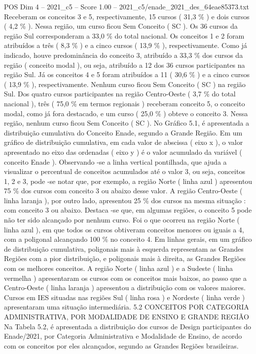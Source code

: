 \begin{textsample}{POS Dim 4 – 2021\_c5 – Score 1.00 – 2021\_c5/enade\_2021\_des\_64eae85373.txt}
Receberam os conceitos 3 e 5, respectivamente, 15 cursos ( 31,3 \% ) e dois cursos ( 4,2 \% ).
Nessa região, um curso ficou Sem Conceito ( SC ).
Os 36 cursos da região Sul corresponderam a 33,0 \% do total nacional.
Os conceitos 1 e 2 foram atribuídos a três ( 8,3 \% ) e a cinco cursos ( 13,9 \% ), respectivamente.
Como já indicado, houve predominância do conceito 3, atribuído a 33,3 \% dos cursos da região ( conceito modal ), ou seja, atribuído a 12 dos 36 cursos participantes na região Sul.
Já os conceitos 4 e 5 foram atribuídos a 11 ( 30,6 \% ) e a cinco cursos ( 13,9 \% ), respectivamente.
Nenhum curso ficou Sem Conceito ( SC ) na região Sul.
Dos quatro cursos participantes na região Centro-Oeste ( 3,7 \% do total nacional ), três ( 75,0 \% em termos regionais ) receberam conceito 5, o conceito modal, como já fora destacado, e um curso ( 25,0 \% ) obteve o conceito 3.
Nessa região, nenhum curso ficou Sem Conceito ( SC ).
No Gráfico 5.1, é apresentada a distribuição cumulativa do Conceito Enade, segundo a Grande Região.
Em um gráfico de distribuição cumulativa, em cada valor de abscissa ( eixo x ), o valor apresentado no eixo das ordenadas ( eixo y ) é o valor acumulado da variável ( conceito Enade ).
Observando -se a linha vertical pontilhada, que ajuda a visualizar o percentual de conceitos acumulados até o valor 3, ou seja, conceitos 1, 2 e 3, pode -se notar que, por exemplo, a região Norte ( linha azul ) apresentou 75 \% dos cursos com conceito 3 ou abaixo desse valor.
A região Centro-Oeste ( linha laranja ), por outro lado, apresentou 25 \% dos cursos na mesma situação : com conceito 3 ou abaixo.
Destaca -se que, em algumas regiões, o conceito 5 pode não ter sido alcançado por nenhum curso.
Foi o que ocorreu na região Norte ( linha azul ), em que todos os cursos obtiveram conceitos menores ou iguais a 4, com a poligonal alcançando 100 \% no conceito 4.
Em linhas gerais, em um gráfico de distribuição cumulativa, poligonais mais à esquerda representam as Grandes Regiões com a pior distribuição, e poligonais mais à direita, as Grandes Regiões com os melhores conceitos.
A região Norte ( linha azul ) e a Sudeste ( linha vermelha ) apresentaram os cursos com os conceitos mais baixos, ao passo que a Centro-Oeste ( linha laranja ) apresentou a distribuição com os valores maiores.
Cursos em IES situadas nas regiões Sul ( linha rosa ) e Nordeste ( linha verde ) apresentaram uma situação intermediária. 5.2 CONCEITOS POR CATEGORIA ADMINISTRATIVA, POR MODALIDADE DE ENSINO E GRANDE REGIÃO Na Tabela 5.2, é apresentada a distribuição dos cursos de Design participantes do Enade/2021, por Categoria Administrativa e Modalidade de Ensino, de acordo com os conceitos por eles alcançados, segundo as Grandes Regiões brasileiras.

\end{textsample}
